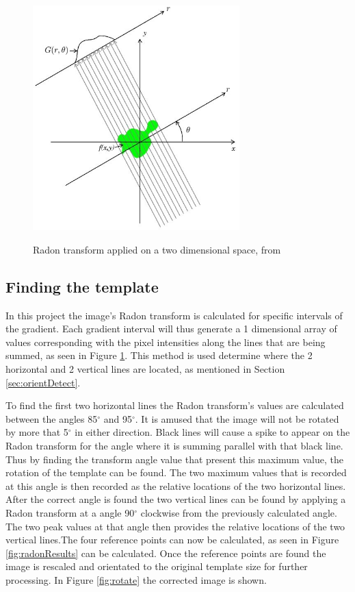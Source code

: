 \begin{figure}
  \centering
  \includegraphics[width=8cm]{RadonT}\\
  \caption{Radon transform applied on a two dimensional space,  from \citet{radon}}
  \label{fig:RadonT}
\end{figure}

\subsection{Finding the template}
\label{sec:findTemplate}

In this project the image's Radon transform is calculated for specific intervals of the gradient. Each gradient interval will thus generate a 1 dimensional array of values corresponding with the pixel intensities along the lines that are being summed, as seen in Figure \ref{fig:RadonT}. This method is used determine where the 2 horizontal and 2 vertical lines are located, as mentioned in Section \ref{sec:orientDetect}. 

To find the first two horizontal lines the Radon transform's values are calculated between the angles 85$^{\circ}$ and 95$^{\circ}$. It is amused that the image will not be rotated by more that 5$^{\circ}$ in either direction. Black lines will cause a spike to appear on the Radon transform for the angle where it is summing parallel with that black line. Thus by finding the transform angle value that present this maximum value, the rotation of the template can be found. The two maximum values that is recorded at this angle is then recorded as the relative locations of the two horizontal lines. After the correct angle is found the two vertical lines can be found by applying a Radon transform at a angle 90$^{\circ}$ clockwise from the previously calculated angle. The two peak values at that angle then provides the relative locations of the two vertical lines.The four reference points can now be calculated, as seen in Figure \ref{fig:radonResults} can be calculated. Once the reference points are found the image is rescaled and orientated to the original template size for further processing. In Figure \ref{fig:rotate} the corrected image is shown.

